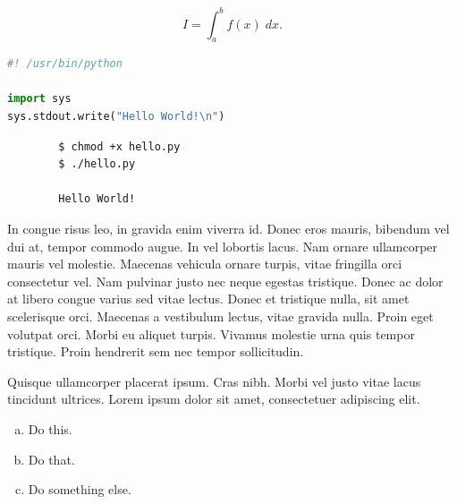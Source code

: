 \documentclass{article}
\begin{document}
\begin{equation}
	I = \int_{a}^{b} f(x) \; dx.
\end{equation}

\begin{file}[hello.py]
\begin{lstlisting}[language=Python]
#! /usr/bin/python

import sys
sys.stdout.write("Hello World!\n")
\end{lstlisting}
\end{file}

\begin{commandline}
	\begin{verbatim}
		$ chmod +x hello.py
		$ ./hello.py

		Hello World!
	\end{verbatim}
\end{commandline}

\begin{warn}[Notice:]
  In congue risus leo, in gravida enim viverra id. Donec eros mauris, bibendum vel dui at, tempor commodo augue. In vel lobortis lacus. Nam ornare ullamcorper mauris vel molestie. Maecenas vehicula ornare turpis, vitae fringilla orci consectetur vel. Nam pulvinar justo nec neque egestas tristique. Donec ac dolor at libero congue varius sed vitae lectus. Donec et tristique nulla, sit amet scelerisque orci. Maecenas a vestibulum lectus, vitae gravida nulla. Proin eget volutpat orci. Morbi eu aliquet turpis. Vivamus molestie urna quis tempor tristique. Proin hendrerit sem nec tempor sollicitudin.
\end{warn}

\begin{question}
	Quisque ullamcorper placerat ipsum. Cras nibh. Morbi vel justo vitae lacus tincidunt ultrices. Lorem ipsum dolor sit amet, consectetuer adipiscing elit.

	\begin{enumerate}[(a)]
		\item Do this.
		\item Do that.
		\item Do something else.
	\end{enumerate}
\end{question}
\end{document}
